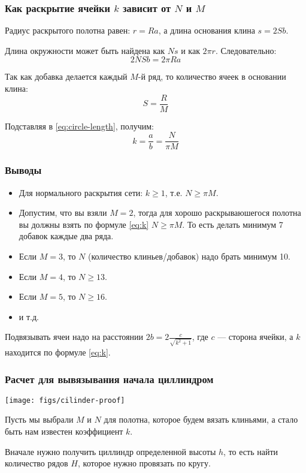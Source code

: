 \begin{frame}
    \frametitle{Как раскрытие ячейки $k$ зависит от $N$ и $M$}

	Радиус раскрытого полотна равен: $r=Ra$, а длина основания клина $s=2Sb$.
	
	Длина окружности может быть найдена как $Ns$ и как $2\pi r$. Следовательно:
	\begin{equation}
		\label{eq:circle-length}
		2NSb=2\pi Ra
	\end{equation}
	
	Так как добавка делается каждый $M$-й ряд, то количество ячеек в основании клина:
	\[
		S=\frac{R}{M}
	\]
	
	Подставляя в \eqref{eq:circle-length}, получим:
	\begin{equation}
		\label{eq:k}
		k=\frac{a}{b}=\frac{N}{\pi M}
	\end{equation}
\end{frame}

\begin{frame}
    \frametitle{Выводы}

	\begin{itemize}
		\item Для нормального раскрытия сети: $k\geq 1$, т.е. $N\geq \pi M$.
		\item Допустим, что вы взяли $M=2$, тогда для хорошо раскрываюшегося полотна вы должны взять по формуле \eqref{eq:k} $N\geq \pi M$. То есть делать минимум 7 добавок каждые два ряда.
		\item Если $M=3$, то $N$ (количество клиньев/добавок) надо брать минимум 10.
		\item Если $M=4$, то $N\geq 13$.
		\item Если $M=5$, то $N\geq 16$.
		\item и т.д.
	\end{itemize}
	
	Подвязывать ячеи надо на расстоянии $2b=2\frac{c}{\sqrt{k^2+1}}$, где $c$ --- сторона ячейки, а $k$ находится по формуле \eqref{eq:k}.
\end{frame}

\begin{frame}
    \frametitle{Расчет для вывязывания начала циллиндром}

    \begin{center}
        \texttt{[image: figs/cilinder-proof]}
    \end{center}
	
	Пусть мы выбрали $M$ и $N$ для полотна, которое будем вязать клиньями, а стало быть нам известен коэффициент $k$.

	Вначале нужно получить циллиндр определенной высоты $h$, то есть найти количество рядов $H$, которое нужно провязать по кругу. 
\end{frame}


